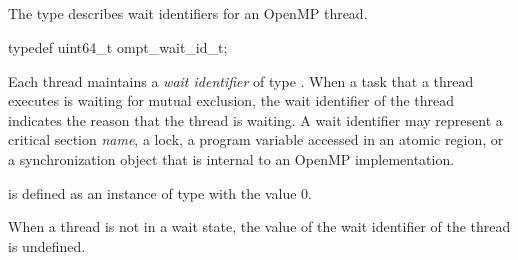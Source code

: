 \subsection{}
\label{sec:ompt_wait_id_t}

\summary
The  type describes wait identifiers for an OpenMP thread.

\format
\begin{ccppspecific}
\begin{omptOther}
typedef uint64_t ompt_wait_id_t;
\end{omptOther}
\end{ccppspecific}

\descr
Each thread maintains a \emph{wait identifier} of type . 
When a task that a thread executes is waiting for mutual exclusion, the wait 
identifier of the thread indicates the reason that the thread is waiting. A 
wait identifier may represent a critical section {\em name}, a lock, a program 
variable accessed in an atomic region, or a synchronization object that is 
internal to an OpenMP implementation.

 is defined as an instance of type 
 with the value 0.

When a thread is not in a wait state, the value of the wait identifier 
of the thread is undefined.

